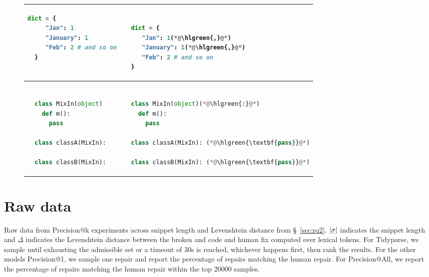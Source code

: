 \documentclass[sigplan,review,acmsmall,nonacm,anonymous]{acmart}\settopmatter{printfolios=false,printccs=false,printacmref=false}
\begin{document}
\begin{figure}[H]
\begin{tabular}{|m{6.6cm}|m{6.6cm}|}
\begin{lstlisting}[basicstyle=\ttfamily\lst@ifdisplaystyle\footnotesize\fi, language=python]
  dict = {
     "Jan": 1
     "January": 1
     "Feb": 2 # and so on
  }

        \end{lstlisting} & \begin{lstlisting}[basicstyle=\ttfamily\lst@ifdisplaystyle\footnotesize\fi, language=python]

  dict = {
     "Jan": 1(*@\hlgreen{,}@*)
     "January": 1(*@\hlgreen{,}@*)
     "Feb": 2 # and so on
  }

        \end{lstlisting} \\\hline
        \begin{lstlisting}[basicstyle=\ttfamily\lst@ifdisplaystyle\footnotesize\fi, language=python]

  class MixIn(object)
    def m():
      pass

  class classA(MixIn):

  class classB(MixIn):

        \end{lstlisting} & \begin{lstlisting}[basicstyle=\ttfamily\lst@ifdisplaystyle\footnotesize\fi, language=python]

  class MixIn(object)(*@\hlgreen{:}@*)
    def m():
      pass

  class classA(MixIn): (*@\hlgreen{\textbf{pass}}@*)

  class classB(MixIn): (*@\hlgreen{\textbf{pass}}@*)

        \end{lstlisting} \\\hline
      \end{tabular}
  \end{figure}

  \clearpage\section{Raw data}\label{sec:raw_prec_data}

  Raw data from Precision@k experiments across snippet length and Levenshtein distance from \S~\ref{sec:rq2}. $|\err\sigma|$ indicates the snippet length and $\Delta$ indicates the Levenshtein distance between the broken and code and human fix computed over lexical tokens. For Tidyparse, we sample until exhausting the admissible set or a timeout of 30s is reached, whichever happens first, then rank the results. For the other models Precision@1, we sample one repair and report the percentage of repairs matching the human repair. For Precision@All, we report the percentage of repairs matching the human repair within the top 20000 samples.
\end{document}
